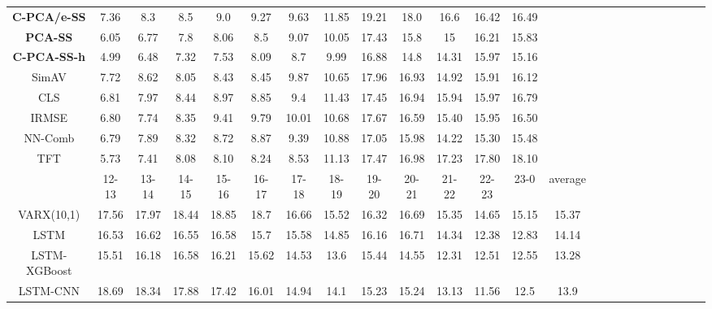 \documentclass{article}
\begin{document}
\begin{table}
{\begin{tabular}{c c c c c c c c c c c c c c c c c c c c c c c c}
\cellcolor{gray!30} \textbf{C-PCA/e-SS} & \cellcolor{gray!30} 7.36 & \cellcolor{gray!30} 8.3 & \cellcolor{gray!30} 8.5 & \cellcolor{gray!30} 9.0 & \cellcolor{gray!30} 9.27 & \cellcolor{gray!30} 9.63 & \cellcolor{gray!30} 11.85 & \cellcolor{gray!30} 19.21 & \cellcolor{gray!30} 18.0 & \cellcolor{gray!30} 16.6 & \cellcolor{gray!30} 16.42 & \cellcolor{gray!30} 16.49 \\
\cellcolor{gray!30} \textbf{PCA-SS} & \cellcolor{gray!30} 6.05 & \cellcolor{gray!30} 6.77 & \cellcolor{gray!30} 7.8 & \cellcolor{gray!30} 8.06 & \cellcolor{gray!30} 8.5 & \cellcolor{gray!30} 9.07 & \cellcolor{gray!30} 10.05 & \cellcolor{gray!30} 17.43 & \cellcolor{gray!30} 15.8 & \cellcolor{gray!30} 15 & \cellcolor{gray!30} 16.21 & \cellcolor{gray!30} 15.83 \\
\cellcolor{gray!30} \textbf{C-PCA-SS-h} & \cellcolor{gray!30} 4.99 & \cellcolor{gray!30} 6.48 & \cellcolor{gray!30} 7.32 & \cellcolor{gray!30} 7.53 & \cellcolor{gray!30} 8.09 & \cellcolor{gray!30} 8.7 & \cellcolor{gray!30} 9.99 & \cellcolor{gray!30} 16.88 & \cellcolor{gray!30} 14.8 & \cellcolor{gray!30} 14.31 & \cellcolor{gray!30} 15.97 & \cellcolor{gray!30} 15.16 \\
SimAV & 7.72 & 8.62 & 8.05 & 8.43 & 8.45 & 9.87 & 10.65 & 17.96 & 16.93 & 14.92 & 15.91 & 16.12 \\
CLS & 6.81 & 7.97 & 8.44 & 8.97 & 8.85 & 9.4 & 11.43 & 17.45 & 16.94 & 15.94 & 15.97 & 16.79 \\
IRMSE & 6.80 & 7.74 & 8.35 & 9.41 & 9.79 & 10.01 & 10.68 & 17.67 & 16.59 & 15.40 & 15.95 & 16.50 \\
NN-Comb & 6.79 & 7.89 & 8.32 & 8.72 & 8.87 & 9.39 & 10.88 & 17.05 & 15.98 & 14.22 & 15.30 & 15.48 \\
TFT & 5.73 & 7.41 & 8.08 & 8.10 & 8.24 & 8.53 & 11.13 & 17.47 & 16.98 & 17.23 & 17.80 & 18.10 \\
\hline
\midrule
& 12-13 & 13-14 & 14-15 & 15-16 & 16-17 & 17-18 & 18-19 & 19-20 & 20-21 & 21-22 & 22-23 & 23-0 & average \\
\hline
\midrule
VARX(10,1) & 17.56 & 17.97 & 18.44 & 18.85 & 18.7 & 16.66 & 15.52 & 16.32 & 16.69 & 15.35 & 14.65 & 15.15 & 15.37 \\
LSTM & 16.53 & 16.62 & 16.55 & 16.58 & 15.7 & 15.58 & 14.85 & 16.16 & 16.71
& 14.34 & 12.38 & 12.83 & 14.14\\
LSTM-XGBoost & 15.51 & 16.18 & 16.58 & 16.21 & 15.62 & 14.53 & 13.6 & 15.44 & 14.55 & 12.31 & 12.51 & 12.55 & 13.28\\
LSTM-CNN & 18.69 & 18.34 & 17.88 & 17.42 & 16.01 & 14.94 & 14.1 & 15.23 & 15.24 & 13.13 & 11.56 & 12.5 & 13.9\\

\end{tabular}}
\end{table}
\end{document}
